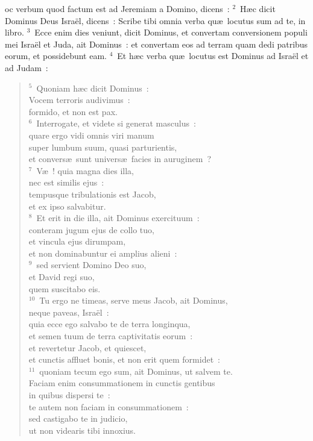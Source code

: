 \bchapter
{}oc verbum quod factum est ad Jeremiam a Domino, dicens~:
${}^{2}$~H\ae c dicit Dominus Deus Isra\"el, dicens~: Scribe tibi omnia verba qu\ae\ locutus sum ad te, in libro.
${}^{3}$~Ecce enim dies veniunt, dicit Dominus, et convertam conversionem populi mei Isra\"el et Juda, ait Dominus~: et convertam eos ad terram quam dedi patribus eorum, et possidebunt eam.
${}^{4}$~Et h\ae c verba qu\ae\ locutus est Dominus ad Isra\"el et ad Judam~:
\begin{flushleft}\begin{verse}${}^{5}$~Quoniam h\ae c dicit Dominus~:\\ Vocem terroris audivimus~:\\ formido, et non est pax.\\
${}^{6}$~Interrogate, et videte si generat masculus~:\\ quare ergo vidi omnis viri manum\\ super lumbum suum, quasi parturientis,\\ et convers\ae\ sunt univers\ae\ facies in auruginem~?\\
${}^{7}$~V\ae~! quia magna dies illa,\\ nec est similis ejus~:\\ tempusque tribulationis est Jacob,\\ et ex ipso salvabitur.\\
${}^{8}$~Et erit in die illa, ait Dominus exercituum~:\\ conteram jugum ejus de collo tuo,\\ et vincula ejus dirumpam,\\ et non dominabuntur ei amplius alieni~:\\
${}^{9}$~sed servient Domino Deo suo,\\ et David regi suo,\\ quem suscitabo eis.\\
${}^{10}$~Tu ergo ne timeas, serve meus Jacob, ait Dominus,\\ neque paveas, Isra\"el~:\\ quia ecce ego salvabo te de terra longinqua,\\ et semen tuum de terra captivitatis eorum~:\\ et revertetur Jacob, et quiescet,\\ et cunctis affluet bonis, et non erit quem formidet~:\\
${}^{11}$~quoniam tecum ego sum, ait Dominus, ut salvem te.\\ Faciam enim consummationem in cunctis gentibus\\ in quibus dispersi te~:\\ te autem non faciam in consummationem~:\\ sed castigabo te in judicio,\\ ut non videaris tibi innoxius.\\

\end{verse}
\end{flushleft}
